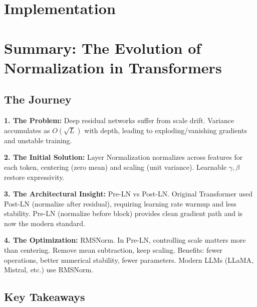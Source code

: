 \documentclass{article}
\begin{document}
\section{Implementation}


\section{Summary: The Evolution of Normalization in Transformers}

\subsection{The Journey}

\textbf{1. The Problem:} Deep residual networks suffer from scale drift. Variance accumulates as $O(\sqrt{L})$ with depth, leading to exploding/vanishing gradients and unstable training.

\textbf{2. The Initial Solution:} Layer Normalization normalizes across features for each token, centering (zero mean) and scaling (unit variance). Learnable $\gamma, \beta$ restore expressivity.

\textbf{3. The Architectural Insight:} Pre-LN vs Post-LN. Original Transformer used Post-LN (normalize after residual), requiring learning rate warmup and less stability. Pre-LN (normalize before block) provides clean gradient path and is now the modern standard.

\textbf{4. The Optimization:} RMSNorm. In Pre-LN, controlling scale matters more than centering. Remove mean subtraction, keep scaling. Benefits: fewer operations, better numerical stability, fewer parameters. Modern LLMs (LLaMA, Mistral, etc.) use RMSNorm.

\subsection{Key Takeaways}
\end{document}
